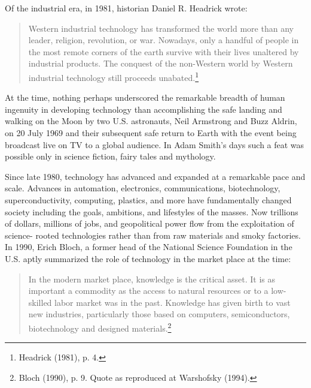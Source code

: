 \begin{multicols}{2}
\vskip 2pt

Of the industrial era, in 1981, historian Daniel R. Headrick wrote:

\begin{quote}
Western industrial technology has transformed the world more than any leader, religion, revolution, or war. Nowadays, only a handful of people in the most remote corners of the earth survive with their lives unaltered by industrial products. The conquest of the non-Western world by Western industrial technology still proceeds unabated.\footnote{Headrick (1981), p. 4.}
\end{quote}

\vskip 5pt

At the time, nothing perhaps underscored the remarkable breadth of human ingenuity in developing technology than accomplishing the safe landing and walking on the Moon by two U.S. astronauts, Neil Armstrong and Buzz Aldrin, on 20 July 1969 and their subsequent safe return to Earth with the event being broadcast live on TV to a global audience. In Adam Smith's days such a feat was possible only in science fiction, fairy tales and mythology.

\newpage

Since late 1980, technology has advanced and expanded at a remarkable pace and scale. Advances in automation, electronics, communications, biotechnology, superconductivity, computing, plastics, and more have fundamentally changed society including the goals, ambitions, and lifestyles of the masses. Now trillions of dollars, millions of jobs, and geopolitical power flow from the exploitation of science- rooted technologies rather than from raw materials and smoky factories. In 1990, Erich Bloch, a former head of the National Science Foundation in the U.S. aptly summarized the role of technology in the market place at the time:
\begin{quote}
In the modern market place, knowledge is the critical asset. It is as important a commodity as the access to natural resources or to a low-skilled labor market was in the past. Knowledge has given birth to vast new industries, particularly those based on computers, semiconductors, biotechnology and designed materials.\footnote{Bloch (1990), p. 9. Quote as reproduced at Warshofsky (1994).}
\end{quote}


\end{multicols}
